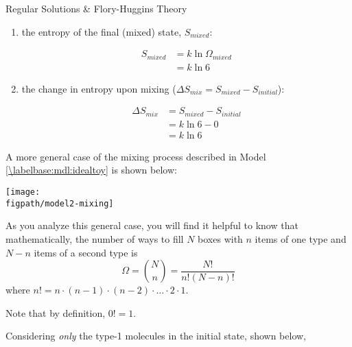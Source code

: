\begin{activity}{Regular Solutions \& Flory-Huggins Theory}
\begin{ctqs}
\begin{enumerate}
			\item the entropy of the final (mixed) state, $S_{mixed}$:
			
				\begin{solution}[0.75in]
					\begin{align*}
						S_{mixed} &= k\ln\Omega_{mixed} \\
							&= k \ln 6
					\end{align*}
				\end{solution}
				
			\item the change in entropy upon mixing ($\Delta S_{mix} = S_{mixed} - S_{initial}$): 
			
				\begin{solution}[0.75in]
					\begin{align*}
						\Delta S_{mix} &= S_{mixed} - S_{initial} \\
							&= k \ln 6 - 0\\
							&= k \ln 6
					\end{align*}
				\end{solution}
				
		\end{enumerate}
		
\end{ctqs}

\begin{model}
	\label{\labelbase:mdl:idealgeneral}

	A more general case of the mixing process described in Model \ref{\labelbase:mdl:idealtoy} is shown below:
	
	\centerline{\texttt{[image: \\figpath/model2-mixing]}}
	
	As you analyze this general case, you will find it helpful to know that mathematically, the number of ways to fill $N$ boxes with $n$ items of one type and $N-n$ items of a second type is
	\begin{equation*}
		\Omega = {N \choose n} = \frac{N!}{n!(N-n)!}
	\end{equation*}
	where $n! = n\cdot(n-1)\cdot(n-2)\cdot\dots\cdot 2 \cdot 1$.
	
	Note that by definition, $0!=1$.

\end{model}

\vspace{0.05in}
\begin{ctqs}
		
		\question Considering \emph{only} the type-1 molecules in the initial state, shown below,
	

\end{ctqs}
\end{activity}
